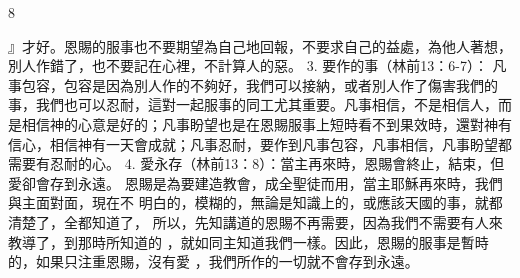 8

』才好。恩賜的服事也不要期望為自己地回報，不要求自己的益處，為他人著想，
別人作錯了，也不要記在心裡，不計算人的惡。
3. 要作的事（林前13：6-7）：
凡事包容，包容是因為別人作的不夠好，我們可以接納，或者別人作了傷害我們的
事，我們也可以忍耐，這對一起服事的同工尤其重要。凡事相信，不是相信人，而
是相信神的心意是好的；凡事盼望也是在恩賜服事上短時看不到果效時，還對神有
信心，相信神有一天會成就；凡事忍耐，要作到凡事包容，凡事相信，凡事盼望都
需要有忍耐的心。
4. 愛永存（林前13：8）：當主再來時，恩賜會終止，結束，但愛卻會存到永遠。
恩賜是為要建造教會，成全聖徒而用，當主耶穌再來時，我們與主面對面，現在不
明白的，模糊的，無論是知識上的，或應該天國的事，就都清楚了，全都知道了，
所以，先知講道的恩賜不再需要，因為我們不需要有人來教導了，到那時所知道的
，就如同主知道我們一樣。因此，恩賜的服事是暫時的，如果只注重恩賜，沒有愛
，我們所作的一切就不會存到永遠。

